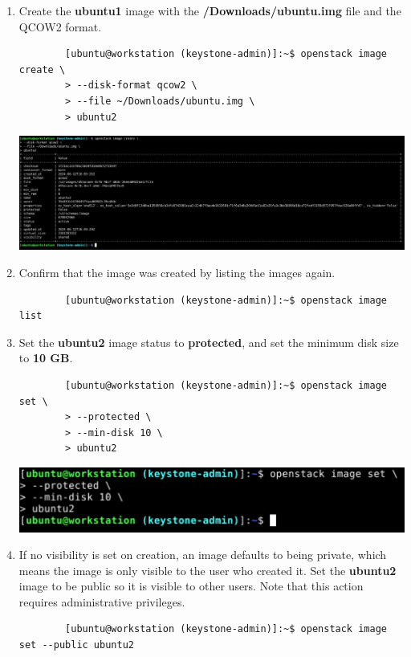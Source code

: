 \documentclass[letterpaper, 12pt]{article}
\begin{document}
\begin{enumerate}
    \item Create the \textbf{ubuntu1} image with the \textbf{\texttildemid/Downloads/ubuntu.img} file and the QCOW2 format.
    \begin{lstlisting}
        [ubuntu@workstation (keystone-admin)]:~$ openstack image create \
        > --disk-format qcow2 \
        > --file ~/Downloads/ubuntu.img \
        > ubuntu2
    \end{lstlisting}

    \begin{center}
        \includegraphics[width=\linewidth]{images/part1/step19.png}
    \end{center}

    \item Confirm that the image was created by listing the images again.
    \begin{lstlisting}
        [ubuntu@workstation (keystone-admin)]:~$ openstack image list
    \end{lstlisting}

    \item Set the \textbf{ubuntu2} image status to \textbf{protected}, and set the minimum disk size to \textbf{10 GB}.
    \begin{lstlisting}
        [ubuntu@workstation (keystone-admin)]:~$ openstack image set \
        > --protected \
        > --min-disk 10 \
        > ubuntu2
    \end{lstlisting}

    \begin{center}
        \includegraphics[width=\linewidth]{images/part1/step21.png}
    \end{center}

    \item If no visibility is set on creation, an image defaults to being private, which means the image is only visible to the user who created it.
    Set the \textbf{ubuntu2} image to be public so it is visible to other users.
    Note that this action requires administrative privileges.
    \begin{lstlisting}
        [ubuntu@workstation (keystone-admin)]:~$ openstack image set --public ubuntu2
    \end{lstlisting}


\end{enumerate}
\end{document}

